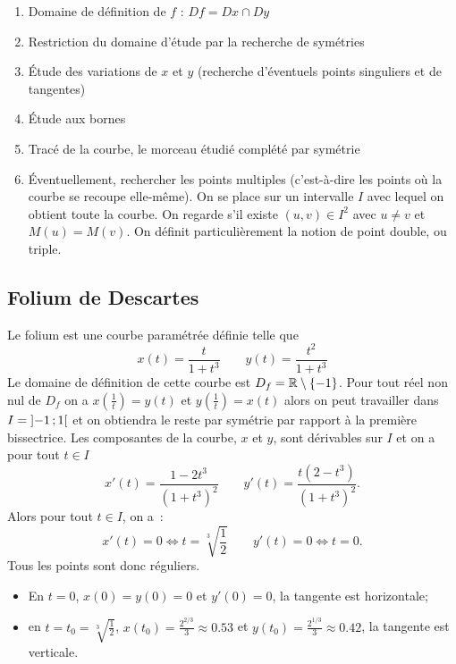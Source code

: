 \begin{enumerate}
  \item Domaine de définition de \(f\) : \(Df = Dx \cap Dy\)
  \item Restriction du domaine d'étude par la recherche de symétries
  \item Étude des variations de \(x\) et \(y\) (recherche d'éventuels points 
    singuliers et de tangentes)
  \item Étude aux bornes
  \item Tracé de la courbe, le morceau étudié complété par symétrie
  \item Éventuellement, rechercher les points multiples (c'est-à-dire les points 
    où la courbe se recoupe elle-même). On se place sur un intervalle \(I\) avec 
    lequel on obtient toute la courbe. On regarde s'il existe \((u, v) \in I^2\) 
    avec \(u \neq v\) et \(M(u)=M(v)\). On définit particulièrement la notion de 
    point double, ou triple.
\end{enumerate}

\subsection{Folium de Descartes}

Le folium est une courbe paramétrée définie telle que
\begin{equation}
  x(t) = \frac{t}{1 + t^3} \qquad y(t)=\frac{t^2}{1 + t^3}
\end{equation}
Le domaine de définition de cette courbe est \(D_f = \mathbb{R}\setminus\{-1\}\). Pour 
tout réel non nul de \(D_f\) on a \(x\left(\frac{1}{t}\right)=y(t)\) et 
\(y\left(\frac{1}{t}\right)=x(t)\) alors on peut travailler dans \(I = 
\left] -1 \, ;  1 \right[\) et on obtiendra le reste par symétrie par rapport à la 
première bissectrice. Les composantes de la courbe, \(x\) et \(y\), sont 
dérivables sur \(I\) et on a pour tout \(t \in I\)
\begin{equation}
  x'(t)=\dfrac{1-2t^3}{(1 + t^3)^2} \qquad y'(t)=\dfrac{t(2-t^3)}{(1 + t^3)^2}.
\end{equation}
Alors pour tout \(t \in I\), on a~:
\begin{equation}
  x'(t)=0 \iff t = \sqrt[3]{\frac{1}{2}} \qquad y'(t)=0 \iff t = 0.
\end{equation}
Tous les points sont donc réguliers.
\begin{itemize}
  \item En \(t = 0\), \(x(0)=y(0)=0\) et \(y'(0)=0\), la tangente est 
    horizontale;
  \item en \(t = t_0 = \sqrt[3]{\frac{1}{2}}\),  \(x(t_0)=\frac{2^{2/3}}{3} 
    \approx 0.53\) et \(y(t_0)=\frac{2^{1/3}}{3}\approx 0.42\), la tangente est 
    verticale.
\end{itemize}

